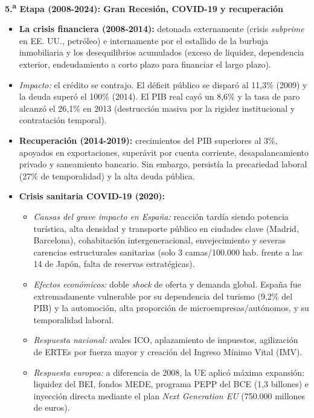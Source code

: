 \textbf{5.\textsuperscript{a} Etapa (2008-2024): Gran Recesión, COVID-19 y recuperación}

\begin{itemize}
  \item \textbf{La crisis financiera (2008-2014):} detonada externamente (crisis \textit{subprime} en EE. UU., petróleo) e internamente por el estallido de la burbuja inmobiliaria y los desequilibrios acumulados (exceso de liquidez, dependencia exterior, endeudamiento a corto plazo para financiar el largo plazo).
  \item \textit{Impacto:} el crédito se contrajo. El déficit público se disparó al 11,3\% (2009) y la deuda superó el 100\% (2014). El PIB real cayó un 8,6\% y la tasa de paro alcanzó el 26,1\% en 2013 (destrucción masiva por la rigidez institucional y contratación temporal).
  \item \textbf{Recuperación (2014-2019):} crecimientos del PIB superiores al 3\%, apoyados en exportaciones, superávit por cuenta corriente, desapalancamiento privado y saneamiento bancario. Sin embargo, persistía la precariedad laboral (27\% de temporalidad) y la alta deuda pública.
  \item \textbf{Crisis sanitaria COVID-19 (2020):}
    \begin{itemize}
      \item \textit{Causas del grave impacto en España:} reacción tardía siendo potencia turística, alta densidad y transporte público en ciudades clave (Madrid, Barcelona), cohabitación intergeneracional, envejecimiento y severas carencias estructurales sanitarias (solo 3 camas/100.000 hab. frente a las 14 de Japón, falta de reservas estratégicas).
      \item \textit{Efectos económicos:} doble \textit{shock} de oferta y demanda global. España fue extremadamente vulnerable por su dependencia del turismo (9,2\% del PIB) y la automoción, alta proporción de microempresas/autónomos, y su temporalidad laboral.
      \item \textit{Respuesta nacional:} avales ICO, aplazamiento de impuestos, agilización de ERTEs por fuerza mayor y creación del Ingreso Mínimo Vital (IMV).
      \item \textit{Respuesta europea:} a diferencia de 2008, la UE aplicó máxima expansión: liquidez del BEI, fondos MEDE, programa PEPP del BCE (1,3 billones) e inyección directa mediante el plan \textit{Next Generation EU} (750.000 millones de euros).
    \end{itemize}
\end{itemize}

